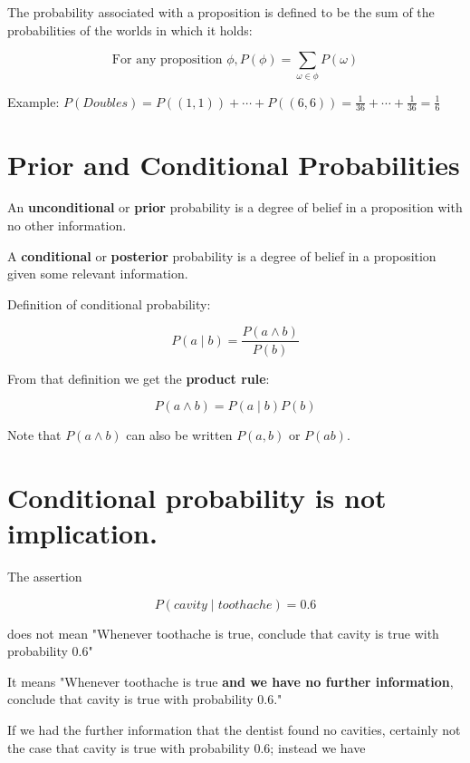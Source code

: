 \documentclass[11pt]{article}
\begin{document}
The probability associated with a proposition is defined to be the sum of the probabilities of the worlds in which it holds:

\begin{equation*}
\text{For any proposition } \phi, P(\phi) = \sum_{\omega \in \phi} P(\omega)
\end{equation*}

Example: \(P(Doubles) = P((1, 1)) + \cdots + P((6, 6)) = \frac{1}{36} + \cdots + \frac{1}{36} = \frac{1}{6}\)
\section{Prior and Conditional Probabilities}
\label{sec:org2738ee6}

An \textbf{unconditional} or \textbf{prior} probability is a degree of belief in a proposition with no other information.

A \textbf{conditional} or \textbf{posterior} probability is a degree of belief in a proposition given some relevant information.

Definition of conditional probability:

\begin{equation*}
P(a  \mid  b) = \frac{P(a \land b)}{P(b)}
\end{equation*}

From that definition we get the \textbf{product rule}:

\begin{equation*}
P(a \land b) = P(a  \mid  b) P(b)
\end{equation*}

Note that \(P(a \land b)\) can also be written \(P(a,b)\) or \(P(ab)\).
\section{Conditional probability is not implication.}
\label{sec:org3ba0f46}

The assertion

\begin{equation*}
P(cavity \mid toothache) = 0.6
\end{equation*}

does not mean "Whenever toothache is true, conclude that cavity is true with probability 0.6"

It means "Whenever toothache is true \textbf{and we have no further information}, conclude that cavity is true with probability 0.6."

If we had the further information that the dentist found no cavities, certainly not the case that cavity is true with probability 0.6; instead we have
\end{document}
